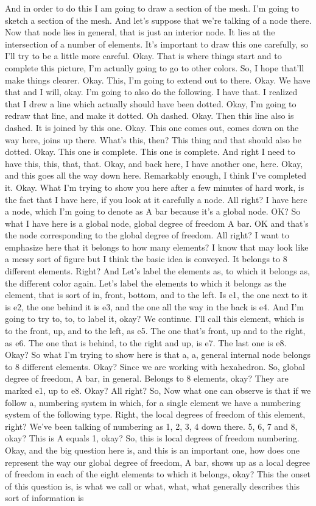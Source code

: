 \documentclass[10pt]{article}
\begin{document}
And in order to do this I am going to draw a section of the mesh. I'm going to sketch a section of the mesh. And let's suppose that we're talking of a node there. Now that node lies in general, that is just an interior node. It lies at the intersection of a number of elements. It's important to draw this one carefully, so I'll try to be a little more careful. Okay. That is where things start and to complete this picture, I'm actually going to go to other colors. So, I hope that'll make things clearer. Okay. This, I'm going to extend out to there. Okay. We have that and I will, okay. I'm going to also do the following. I have that. I realized that I drew a line which actually should have been dotted. Okay, I'm going to redraw that line, and make it dotted. Oh dashed. Okay. Then this line also is dashed. It is joined by this one. Okay. This one comes out, comes down on the way here, joins up there. What's this, then? This thing and that should also be dotted. Okay. This one is complete. This one is complete. And right I need to have this, this, that, that. Okay, and back here, I have another one, here. Okay, and this goes all the way down here. Remarkably enough, I think I've completed it. Okay. What I'm trying to show you here after a few minutes of hard work, is the fact that I have here, if you look at it carefully a node. All right? I have here a node, which I'm going to denote as A bar because it's a global node. OK? So what I have here is a global node, global degree of freedom A bar. OK and that's the node corresponding to the global degree of freedom. All right? I want to emphasize here that it belongs to how many elements? I know that may look like a messy sort of figure but I think the basic idea is conveyed. It belongs to 8 different elements. Right? And Let's label the elements as, to which it belongs as, the different color again. Let's label the elements to which it belongs as the element, that is sort of in, front, bottom, and to the left. Is e1, the one next to it is e2, the one behind it is e3, and the one all the way in the back is e4. And I'm going to try to, to, to label it, okay? We continue. I'll call this element, which is to the front, up, and to the left, as e5. The one that's front, up and to the right, as e6. The one that is behind, to the right and up, is e7. The last one is e8. Okay? So what I'm trying to show here is that a, a, general internal node belongs to 8 different elements. Okay? Since we are working with hexahedron. So, global degree of freedom, A bar, in general. Belongs to 8 elements, okay? They are marked e1, up to e8. Okay? All right? So, Now what one can observe is that if we follow a, numbering system in which, for a single element we have a numbering system of the following type. Right, the local degrees of freedom of this element, right? We've been talking of numbering as 1, 2, 3, 4 down there. 5, 6, 7 and 8, okay? This is A equals 1, okay? So, this is local degrees of freedom numbering. Okay, and the big question here is, and this is an important one, how does one represent the way our global degree of freedom, A bar, shows up as a local degree of freedom in each of the eight elements to which it belongs, okay? This the onset of this question is, is what we call or what, what, what generally describes this sort of information is 
\end{document}
